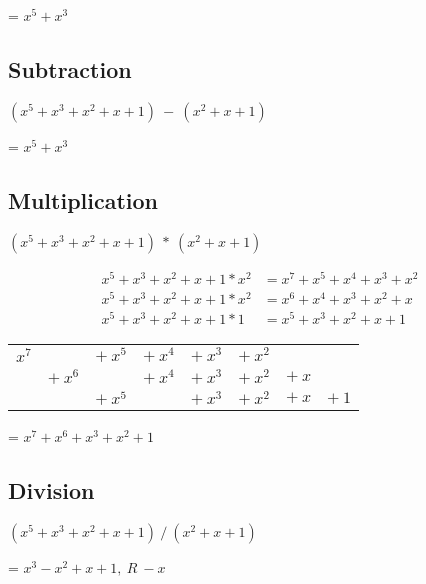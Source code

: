 \documentclass[letterpaper]{article}
\begin{document}
= \(x^5 + x^3\)

\subsection{Subtraction}

\((x^5 + x^3 + x^2 + x + 1)\ -\ (x^2 + x + 1)\)

= \(x^5 + x^3\)

\subsection{Multiplication}

\((x^5 + x^3 + x^2 + x + 1)\ *\ (x^2 + x + 1)\)

\begin{equation*}
  \begin{split}
    x^5 + x^3 + x^2 + x + 1 * x^2 &= x^7 + x^5 + x^4 + x^3 + x^2 \\
    x^5 + x^3 + x^2 + x + 1 * x^2 &= x^6 + x^4 + x^3 + x^2 + x \\
    x^5 + x^3 + x^2 + x + 1 * 1 &= x^5 + x^3 + x^2 + x + 1
  \end{split}
\end{equation*}

\begin{tabular}{ c c c c c c c c }
\(x^7\) &   & \(+\ x^5\) & \(+\ x^4\) & \(+\ x^3\) &\(+\ x^2\)&   &   \\
  & \(+\ x^6\) &   & \(+\ x^4\) & \(+\ x^3\) & \(+\ x^2\) &\(+\ x\) &   \\
  &   & \(+\ x^5\) &   & \(+\ x^3\) & \(+\ x^2\) & \(+\ x\) & \(+\ 1\) \\
\end{tabular}

= \(x^7 + x^6 + x^3 + x^2 + 1\)

\subsection{Division}

\((x^5 + x^3 + x^2 + x + 1)\ /\ (x^2 + x + 1)\)


= \(x^3 - x^2 + x + 1,\ R\ -x\)
\end{document}
